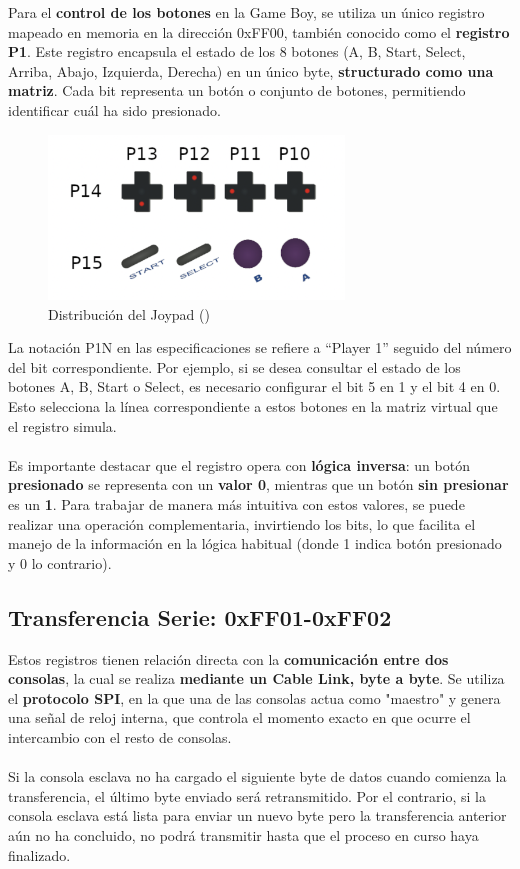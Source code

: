 Para el \textbf{control de los botones} en la Game Boy, se utiliza un único registro mapeado en memoria en la dirección 0xFF00, también conocido como el \textbf{registro P1}. Este registro encapsula el estado de los 8 botones (A, B, Start, Select, Arriba, Abajo, Izquierda, Derecha) en un único byte, \textbf{structurado como una matriz}. Cada bit representa un botón o conjunto de botones, permitiendo identificar cuál ha sido presionado.

\begin{figure}[H]
    \centering
    \includegraphics[width=0.7\textwidth]{include/images/joypad.png}
    \caption{Distribución del Joypad (\cite{goldensacra})}
    \label{figure:joypad}
\end{figure}

La notación P1N en las especificaciones se refiere a “Player 1” seguido del número del bit correspondiente. Por ejemplo, si se desea consultar el estado de los botones A, B, Start o Select, es necesario configurar el bit 5 en 1 y el bit 4 en 0. Esto selecciona la línea correspondiente a estos botones en la matriz virtual que el registro simula.
\\\\
Es importante destacar que el registro opera con \textbf{lógica inversa}: un botón \textbf{presionado} se representa con un \textbf{valor 0}, mientras que un botón \textbf{sin presionar} es un \textbf{1}. Para trabajar de manera más intuitiva con estos valores, se puede realizar una operación complementaria, invirtiendo los bits, lo que facilita el manejo de la información en la lógica habitual (donde 1 indica botón presionado y 0 lo contrario).

\subsection{Transferencia Serie: 0xFF01-0xFF02}

Estos registros tienen relación directa con la \textbf{comunicación entre dos consolas}, la cual se realiza \textbf{mediante un Cable Link, byte a byte}. Se utiliza el \textbf{protocolo SPI}, en la que una de las consolas actua como "maestro" y genera una señal de reloj interna, que controla el momento exacto en que ocurre el intercambio con el resto de consolas.
\\\\
Si la consola esclava no ha cargado el siguiente byte de datos cuando comienza la transferencia, el último byte enviado será retransmitido. Por el contrario, si la consola esclava está lista para enviar un nuevo byte pero la transferencia anterior aún no ha concluido, no podrá transmitir hasta que el proceso en curso haya finalizado.

